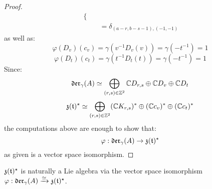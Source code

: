 \begin{proof}
$$\begin{aligned}
\begin{cases}
                            \end{cases}
                            \\
                            & = \delta_{(a - r, b - s - 1), (-1, -1)}
                        \end{aligned}
                    $$
                as well as:
                    $$\varphi(D_v)(c_v) = \gamma(v^{-1} D_v(v)) = \gamma( -t^{-1} ) = 1$$
                    $$\varphi(D_t)(c_t) = \gamma(t^{-1} D_t(t)) = \gamma( -t^{-1} ) = 1$$
                Since:
                    $$\mathfrak{der}_{\gamma}(A) \simeq \bigoplus_{(r, s) \in \mathbb{Z}^2} \mathbb{C} D_{r, s} \oplus \mathbb{C} D_v \oplus \mathbb{C} D_t$$
                    $$\mathfrak{z}(\mathfrak{t})^{\star} \simeq \bigoplus_{(r, s) \in \mathbb{Z}^2} (\mathbb{C} K_{r, s})^* \oplus (\mathbb{C} c_v)^* \oplus (\mathbb{C} c_t)^*$$
                the computations above are enough to show that:
                    $$\varphi: \mathfrak{der}_{\gamma}(A) \to \mathfrak{z}(\mathfrak{t})^{\star}$$
                as given is a vector space isomorphism.
            \end{proof}
        \begin{corollary} \label{coro: lie_bracket_on_graded_dual_of_toroidal_centres}
            $\mathfrak{z}(\mathfrak{t})^{\star}$ is naturally a Lie algebra via the vector space isomorphism $\varphi: \mathfrak{der}_{\gamma}(A) \xrightarrow[]{\simeq} \mathfrak{z}(\mathfrak{t})^{\star}$.
        \end{corollary}
